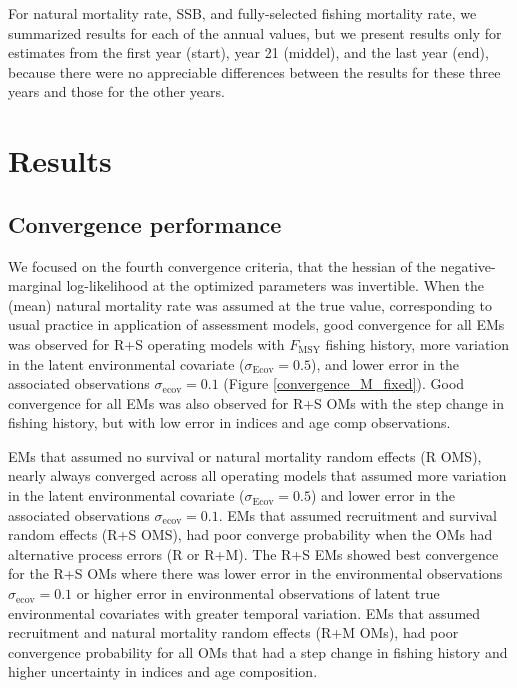 \documentclass[
  12pt,
]{article}
\newcommand{\Fmsy}{\ensuremath{F_{\text{MSY}}}\xspace}
\begin{document}
For natural mortality rate, SSB, and fully-selected fishing mortality
rate, we summarized results for each of the annual values, but we
present results only for estimates from the first year (start), year 21
(middel), and the last year (end), because there were no appreciable
differences between the results for these three years and those for the
other years.

\hypertarget{results}{%
\section*{Results}\label{results}}

\hypertarget{convergence-performance}{%
\subsection*{Convergence performance}\label{convergence-performance}}

We focused on the fourth convergence criteria, that the hessian of the
negative-marginal log-likelihood at the optimized parameters was
invertible. When the (mean) natural mortality rate was assumed at the
true value, corresponding to usual practice in application of assessment
models, good convergence for all EMs was observed for R+S operating
models with \Fmsy fishing history, more variation in the latent
environmental covariate (\(\sigma_\text{Ecov} = 0.5\)), and lower error
in the associated observations \(\sigma_\text{ecov} = 0.1\) (Figure
\ref{convergence_M_fixed}). Good convergence for all EMs was also
observed for R+S OMs with the step change in fishing history, but with
low error in indices and age comp observations.

EMs that assumed no survival or natural mortality random effects (R
OMS), nearly always converged across all operating models that assumed
more variation in the latent environmental covariate
(\(\sigma_\text{Ecov} = 0.5\)) and lower error in the associated
observations \(\sigma_\text{ecov} = 0.1\). EMs that assumed recruitment
and survival random effects (R+S OMS), had poor converge probability
when the OMs had alternative process errors (R or R+M). The R+S EMs
showed best convergence for the R+S OMs where there was lower error in
the environmental observations \(\sigma_\text{ecov} = 0.1\) or higher
error in environmental observations of latent true environmental
covariates with greater temporal variation. EMs that assumed recruitment
and natural mortality random effects (R+M OMs), had poor convergence
probability for all OMs that had a step change in fishing history and
higher uncertainty in indices and age composition.
\end{document}
